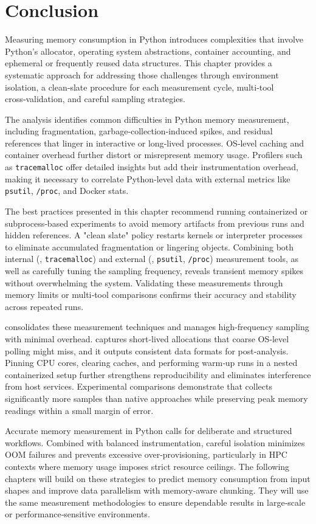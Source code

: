 \section{Conclusion}
\label{sec:mmc-conclusion}

Measuring memory consumption in Python introduces complexities that involve Python's allocator, operating system abstractions, container accounting, and ephemeral or frequently reused data structures.
This chapter provides a systematic approach for addressing those challenges through environment isolation, a clean‑slate procedure for each measurement cycle, multi‑tool cross‑validation, and careful sampling strategies.

The analysis identifies common difficulties in Python memory measurement, including fragmentation, garbage‑collection‑induced spikes, and residual references that linger in interactive or long‑lived processes.
\ac{OS}‑level caching and container overhead further distort or misrepresent memory usage.
Profilers such as \texttt{tracemalloc} offer detailed insights but add their instrumentation overhead, making it necessary to correlate Python‑level data with external metrics like \texttt{psutil}, \texttt{/proc}, and Docker stats.

The best practices presented in this chapter recommend running containerized or subprocess‑based experiments to avoid memory artifacts from previous runs and hidden references.
A "clean slate" policy restarts kernels or interpreter processes to eliminate accumulated fragmentation or lingering objects.
Combining both internal (\eg, \texttt{tracemalloc}) and external (\eg, \texttt{psutil}, \texttt{/proc}) measurement tools, as well as carefully tuning the sampling frequency, reveals transient memory spikes without overwhelming the system.
Validating these measurements through memory limits or multi‑tool comparisons confirms their accuracy and stability across repeated runs.

\traceq consolidates these measurement techniques and manages high‑frequency sampling with minimal overhead.
\traceq captures short‑lived allocations that coarse \ac{OS}‑level polling might miss, and it outputs consistent data formats for post‑analysis.
Pinning \ac{CPU} cores, clearing caches, and performing warm‑up runs in a nested containerized setup further strengthens reproducibility and eliminates interference from host services.
Experimental comparisons demonstrate that \traceq collects significantly more samples than native approaches while preserving peak memory readings within a small margin of error.

Accurate memory measurement in Python calls for deliberate and structured workflows.
Combined with balanced instrumentation, careful isolation minimizes \ac{OOM} failures and prevents excessive over‑provisioning, particularly in \ac{HPC} contexts where memory usage imposes strict resource ceilings.
The following chapters will build on these strategies to predict memory consumption from input shapes and improve data parallelism with memory‑aware chunking. They will use the same measurement methodologies to ensure dependable results in large‑scale or performance‑sensitive environments.